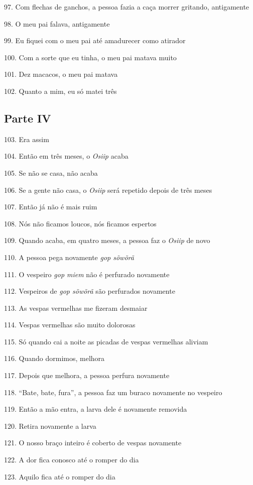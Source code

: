 97. Com flechas de ganchos, a pessoa fazia a caça morrer gritando, antigamente

98. O meu pai falava, antigamente

99. Eu fiquei com o meu pai até amadurecer como atirador

100. Com a sorte que eu tinha, o meu pai matava muito

101. Dez macacos, o meu pai matava

102. Quanto a mim, eu só matei três

\subsection{Parte IV}

103. Era assim

104. Então em três meses, o \emph{Osiip} acaba

105. Se não se casa, não acaba

106. Se a gente não casa, o \emph{Osiip} será repetido depois de três
meses

107. Então já não é mais ruim

108. Nós não ficamos loucos, nós ficamos espertos

109. Quando acaba, em quatro meses, a pessoa faz o \emph{Osiip} de novo

110. A pessoa pega novamente \emph{gop sõwõrã}

111. O vespeiro \emph{gop miem} não é perfurado novamente

112. Vespeiros de \emph{gop sõwõrã} são perfurados novamente

113. As vespas vermelhas me fizeram desmaiar

114. Vespas vermelhas são muito dolorosas

115. Só quando cai a noite as picadas de vespas vermelhas aliviam

116. Quando dormimos, melhora

117. Depois que melhora, a pessoa perfura novamente

118. ``Bate, bate, fura'', a pessoa faz um buraco novamente no vespeiro

119. Então a mão entra, a larva dele é novamente removida

120. Retira novamente a larva

121. O nosso braço inteiro é coberto de vespas novamente

122. A dor fica conosco até o romper do dia

123. Aquilo fica até o romper do dia

